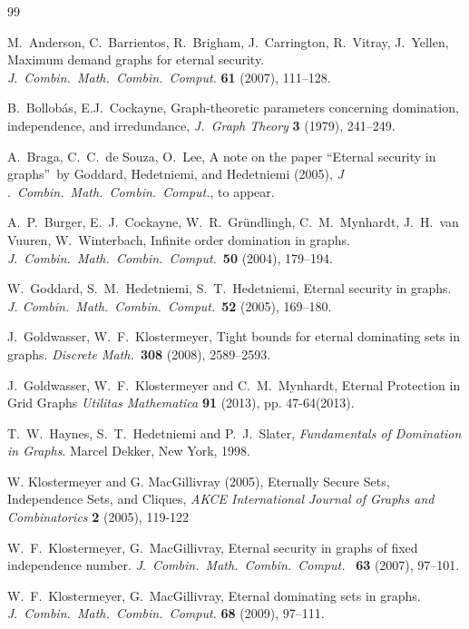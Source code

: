 \documentclass[12pt]{article}%
\begin{document}
\begin{thebibliography}{99}                                                                                               %


M.~Anderson, C.~Barrientos, R.~Brigham, J.~Carrington,
R.~Vitray, J.~Yellen, Maximum demand graphs for eternal security.
\emph{J}.~\emph{Combin.~Math.~Combin.~Comput.} \textbf{61} (2007), 111--128.

B.~Bollob\'{a}s, E.J.~Cockayne, Graph-theoretic parameters
concerning domination, independence, and irredundance, \emph{J.~Graph Theory}
\textbf{3} (1979), 241--249.

A.~Braga, C.~C.~de Souza, O.~Lee, A note on the paper
\textquotedblleft Eternal security in graphs\textquotedblright\ by Goddard,
Hedetniemi, and Hedetniemi (2005), \emph{J}%
.~\emph{Combin.~Math.~Combin.~Comput.}, to appear.

A.~P.~Burger, E.~J.~Cockayne, W.~R.~Gr\"{u}ndlingh,
C.~M.~Mynhardt, J.~H.~van Vuuren, W.~Winterbach, Infinite order domination in
graphs. \emph{J}.~\emph{Combin.~Math.~Combin.~Comput.}~\textbf{50} (2004), 179--194.

W.~Goddard, S.~M.~Hedetniemi, S.~T.~Hedetniemi, Eternal security
in graphs. \emph{J. Combin.~Math.~Combin.~Comput.}~\textbf{52} (2005), 169--180.

J.~Goldwasser, W.~F.~Klostermeyer, Tight bounds for eternal
dominating sets in graphs. \emph{Discrete Math.~}\textbf{308} (2008), 2589--2593.

J.~Goldwasser, W.~F.~Klostermeyer and C.~M.~Mynhardt, Eternal
Protection in Grid Graphs \emph{Utilitas Mathematica} \textbf{91} (2013), pp. 47-64(2013).

T.~W.~Haynes, S.~T.~Hedetniemi and P.~J.~Slater,
\emph{Fundamentals of Domination in Graphs}. Marcel Dekker, New York, 1998.

W. Klostermeyer and G. MacGillivray (2005), Eternally Secure
Sets, Independence Sets, and Cliques, \textit{AKCE International Journal of
Graphs and Combinatorics} \textbf{2} (2005), 119-122

W.~F.~Klostermeyer, G.~MacGillivray, Eternal security in graphs
of fixed independence number. \emph{J}.~\emph{Combin.~Math.~Combin.~Comput.}%
~\textbf{63} (2007), 97--101.

W.~F.~Klostermeyer, G.~MacGillivray, Eternal dominating sets in
graphs. \emph{J}.~\emph{Combin.~Math.~Combin.~Comput.} \textbf{68} (2009), 97--111.


\end{thebibliography}
\end{document}
